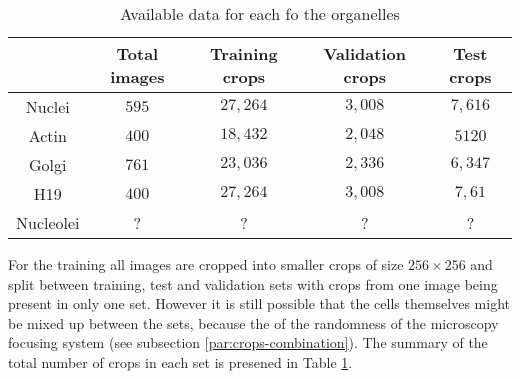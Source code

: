 \begin{table}[H]
    \centering
    \caption{Available data for each fo the organelles}
        \begin{adjustbox}{width=0.7\textwidth}
            \begin{tabular}{|c||c|c|c|c|}\hline
                &Total images
                &Training crops
                &Validation crops
                &Test crops
                \\\hline\hline
                Nuclei & $595$ & $27,264$ & $3,008$ & $7,616$\\\hline
                Actin &$400$ & $18,432$ & $2,048$ &$5120$\\\hline
                Golgi & $761$ & $23,036$ & $2,336$ & $6,347$\\\hline
                H19 & $400$ &$ 27,264$ & $3,008$ & $7,61$ \\\hline
                Nucleolei &?&?&?&?\\\hline
            \end{tabular}
        \end{adjustbox}
    \label{table:data}
\end{table}

For the training all images are cropped into smaller crops of size $256 \times 256$ and split between training, test and validation sets with crops from one image being present in only one set. However it is still possible that the cells themselves might be mixed up between the sets, because the of the randomness of the microscopy focusing system (see subsection \ref{par:crops-combination}). The summary of the total number of crops in each set is presened in Table \ref{table:data}.


